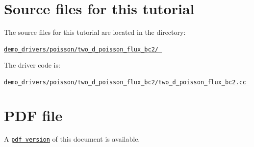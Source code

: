 

\hypertarget{index_sources}{}\section{Source files for this tutorial}\label{index_sources}

\begin{DoxyItemize}
\item The source files for this tutorial are located in the directory\+: \begin{center} \href{../../../../demo_drivers/poisson/two_d_poisson_flux_bc2/}{\tt demo\+\_\+drivers/poisson/two\+\_\+d\+\_\+poisson\+\_\+flux\+\_\+bc2/ } \end{center} 
\item The driver code is\+: \begin{center} \href{../../../../demo_drivers/poisson/two_d_poisson_flux_bc2/two_d_poisson_flux_bc2.cc}{\tt demo\+\_\+drivers/poisson/two\+\_\+d\+\_\+poisson\+\_\+flux\+\_\+bc2/two\+\_\+d\+\_\+poisson\+\_\+flux\+\_\+bc2.\+cc } \end{center} 
\end{DoxyItemize}

 

 \hypertarget{index_pdf}{}\section{P\+D\+F file}\label{index_pdf}
A \href{../latex/refman.pdf}{\tt pdf version} of this document is available. 
